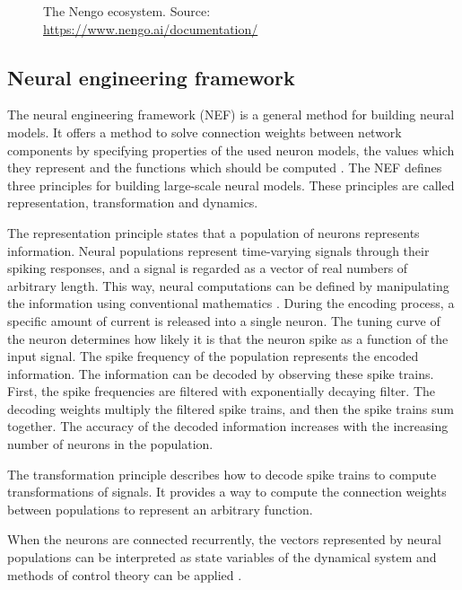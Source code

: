 \begin{figure}[ht]
    \centering
    
    \caption{The Nengo ecosystem. Source: \url{https://www.nengo.ai/documentation/}}
    \label{fig:nengo_ecosystem}
\end{figure}

\subsection{Neural engineering framework}
The neural engineering framework (NEF) is a general method for building neural models. It offers a method to solve connection weights between network components by specifying properties of the used neuron models, the values which they represent and the functions which should be computed \cite{stewartTechnicalOverviewNeural2012}. The NEF defines three principles for building large-scale neural models. These principles are called representation, transformation and dynamics. \par
The representation principle states that a population of neurons represents information. Neural populations represent time-varying signals through their spiking responses, and a signal is regarded as a vector of real numbers of arbitrary length.  This way, neural computations can be defined by manipulating the information using conventional mathematics \cite{bekolayNengoPythonTool2014}. During the encoding process, a specific amount of current is released into a single neuron. The tuning curve of the neuron determines how likely it is that the neuron spike as a function of the input signal. The spike frequency of the population represents the encoded information. The information can be decoded by observing these spike trains. First, the spike frequencies are filtered with exponentially decaying filter. The decoding weights multiply the filtered spike trains, and then the spike trains sum together. The accuracy of the decoded information increases with the increasing number of neurons in the population. \par
The transformation principle describes how to decode spike trains to compute transformations of signals. It provides a way to compute the connection weights between populations to represent an arbitrary function. \par
When the neurons are connected recurrently, the vectors represented by neural populations can be interpreted as state variables of the dynamical system and methods of control theory can be applied \cite{bekolayNengoPythonTool2014}.

